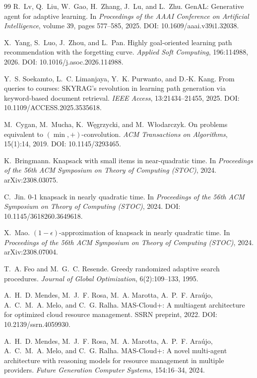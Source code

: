 \begin{thebibliography}{99}
 R.~Lv, Q.~Liu, W.~Gao, H.~Zhang, J.~Lu, and L.~Zhu. GenAL: Generative agent for adaptive learning. In \emph{Proceedings of the AAAI Conference on Artificial Intelligence}, volume 39, pages 577--585, 2025. DOI: 10.1609/aaai.v39i1.32038.

 X.~Yang, S.~Luo, J.~Zhou, and L.~Pan. Highly goal-oriented learning path recommendation with the forgetting curve. \emph{Applied Soft Computing}, 196:114988, 2026. DOI: 10.1016/j.asoc.2026.114988.

 Y.~S. Soekamto, L.~C. Limanjaya, Y.~K. Purwanto, and D.-K. Kang. From queries to courses: SKYRAG's revolution in learning path generation via keyword-based document retrieval. \emph{IEEE Access}, 13:21434--21455, 2025. DOI: 10.1109/ACCESS.2025.3535618.

 M.~Cygan, M.~Mucha, K.~W\k{e}grzycki, and M.~W\l{}odarczyk. On problems equivalent to $(\min,+)$-convolution. \emph{ACM Transactions on Algorithms}, 15(1):14, 2019. DOI: 10.1145/3293465.

 K.~Bringmann. Knapsack with small items in near-quadratic time. In \emph{Proceedings of the 56th ACM Symposium on Theory of Computing (STOC)}, 2024. arXiv:2308.03075.

 C.~Jin. 0-1 knapsack in nearly quadratic time. In \emph{Proceedings of the 56th ACM Symposium on Theory of Computing (STOC)}, 2024. DOI: 10.1145/3618260.3649618.

 X.~Mao. $(1-\epsilon)$-approximation of knapsack in nearly quadratic time. In \emph{Proceedings of the 56th ACM Symposium on Theory of Computing (STOC)}, 2024. arXiv:2308.07004.

 T.~A. Feo and M.~G.~C. Resende. Greedy randomized adaptive search procedures. \emph{Journal of Global Optimization}, 6(2):109--133, 1995.

 A.~H.~D. Mendes, M.~J.~F. Rosa, M.~A. Marotta, A.~P.~F. Ara\'ujo, A.~C.~M.~A. Melo, and C.~G. Ralha. MAS-Cloud+: A multiagent architecture for optimized cloud resource management. SSRN preprint, 2022. DOI: 10.2139/ssrn.4059930.

 A.~H.~D. Mendes, M.~J.~F. Rosa, M.~A. Marotta, A.~P.~F. Ara\'ujo, A.~C.~M.~A. Melo, and C.~G. Ralha. MAS-Cloud+: A novel multi-agent architecture with reasoning models for resource management in multiple providers. \emph{Future Generation Computer Systems}, 154:16--34, 2024.


\end{thebibliography}
